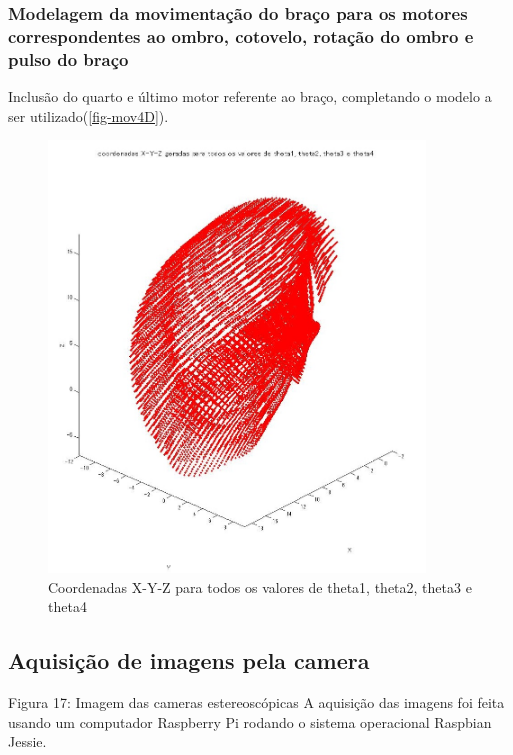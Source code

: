 	\subsubsection{Modelagem da movimentação do braço para os motores correspondentes ao ombro, cotovelo, rotação do ombro e pulso do braço}\label{subsubsec-modelagem4m}

	Inclusão do quarto e último motor referente ao braço, completando o modelo a ser utilizado(\autoref{fig-mov4D}).\par

	\begin{figure}[htb!]
	\caption{\label{fig-mov4D}  Coordenadas X-Y-Z para todos os valores de theta1, theta2, theta3 e theta4 }
	\begin{center}
		\includegraphics[width=100mm]{4dof.jpg}	
	\end{center}
\end{figure}

\subsection{Aquisição de imagens pela camera}\label{subsec-cameras}

Figura 17: Imagem das cameras estereoscópicas
A aquisição das imagens foi feita usando um computador Raspberry Pi rodando o sistema operacional Raspbian Jessie.\par 

